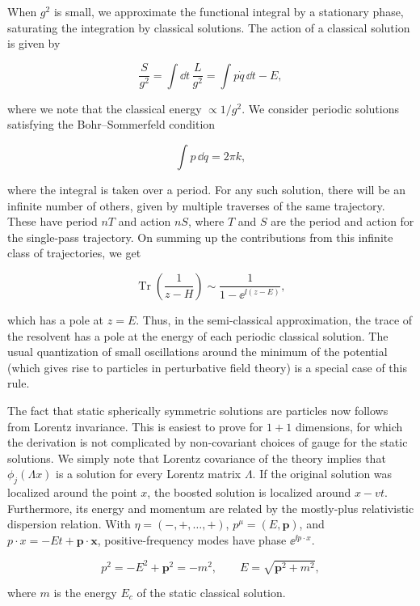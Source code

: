 When $g^2$ is small, we approximate the functional integral by a stationary
phase, saturating the integration by classical solutions. The action of a
classical solution is given by

\[
  \frac{S}{g^2}=\int\dd t\,\frac{L}{g^2}
  =\int p\dot q\,\dd t-E,
\]

where we note that the classical energy $\propto1/g^2$. We consider periodic
solutions satisfying the Bohr--Sommerfeld condition

\[
  \int p\,\dd q=2\pi k,
\]

where the integral is taken over a period. For any such solution, there will be
an infinite number of others, given by multiple traverses of the same
trajectory. These have period $nT$ and action $nS$, where $T$ and $S$ are the
period and action for the single-pass trajectory. On summing up the contributions
from this infinite class of trajectories, we get

\[
  \operatorname{Tr}\left(\frac{1}{z-H}\right)
  \sim\frac{1}{1-\ee^{\ii(z-E)}},
\]

which has a pole at $z=E$. Thus, in the semi-classical approximation, the trace
of the resolvent has a pole at the energy of each periodic classical solution.
The usual quantization of small oscillations around the minimum of the potential
(which gives rise to particles in perturbative field theory) is a special case of
this rule.

The fact that static spherically symmetric solutions are particles now follows
from Lorentz invariance. This is easiest to prove for $1+1$ dimensions, for
which the derivation is not complicated by non-covariant choices of gauge for the
static solutions. We simply note that Lorentz covariance of the theory implies
that $\phi_j(\Lambda x)$ is a solution for every Lorentz matrix $\Lambda$. If
the original solution was localized around the point $x$, the boosted solution is
localized around $x-vt$. Furthermore, its energy and momentum are related by the
mostly-plus relativistic dispersion relation. With $\eta=(-,+,\ldots,+)$,
$p^\mu=(E,\mathbf p)$, and $p\mathbin{\cdot}x=-Et+\mathbf p\mathbin{\cdot}\mathbf x$,
positive-frequency modes have phase $\ee^{\ii p\cdot x}$.

\[
  p^2=-E^2+\mathbf p^2=-m^2,
  \qquad E=\sqrt{\mathbf p^2+m^2},
\]

where $m$ is the energy $E_c$ of the static classical solution.


